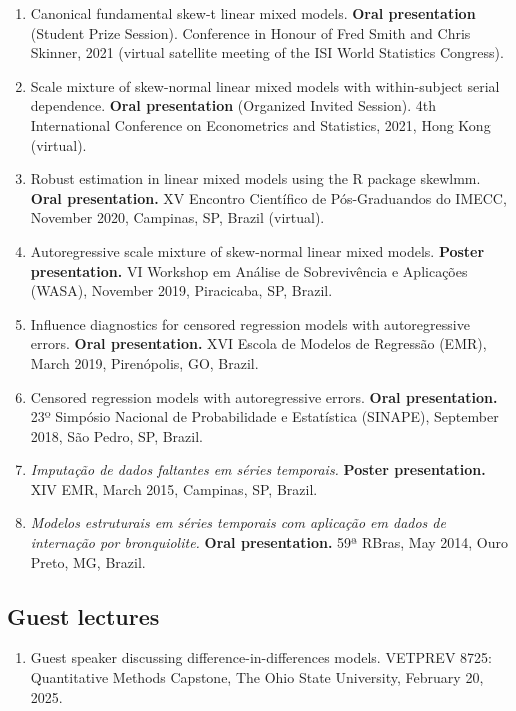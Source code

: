 \documentclass[
  10pt,
  letterpaper,
]{article}
\providecommand{\tightlist}{%
  \setlength{\itemsep}{0pt}\setlength{\parskip}{0pt}}
\begin{document}
\begin{enumerate}
\item
  Canonical fundamental skew-t linear mixed models. \textbf{Oral
  presentation} (Student Prize Session). Conference in Honour of Fred
  Smith and Chris Skinner, 2021 (virtual satellite meeting of the ISI
  World Statistics Congress).
\item
  Scale mixture of skew-normal linear mixed models with within-subject
  serial dependence. \textbf{Oral presentation} (Organized Invited
  Session). 4th International Conference on Econometrics and Statistics,
  2021, Hong Kong (virtual).
\item
  Robust estimation in linear mixed models using the R package skewlmm.
  \textbf{Oral presentation.} XV Encontro Científico de Pós-Graduandos
  do IMECC, November 2020, Campinas, SP, Brazil (virtual).
\item
  Autoregressive scale mixture of skew-normal linear mixed models.
  \textbf{Poster presentation.} VI Workshop em Análise de Sobrevivência
  e Aplicações (WASA), November 2019, Piracicaba, SP, Brazil.
\item
  Influence diagnostics for censored regression models with
  autoregressive errors. \textbf{Oral presentation.} XVI Escola de
  Modelos de Regressão (EMR), March 2019, Pirenópolis, GO, Brazil.
\item
  Censored regression models with autoregressive errors. \textbf{Oral
  presentation.} 23º Simpósio Nacional de Probabilidade e Estatística
  (SINAPE), September 2018, São Pedro, SP, Brazil.
\item
  \emph{Imputação de dados faltantes em séries temporais.}
  \textbf{Poster presentation.} XIV EMR, March 2015, Campinas, SP,
  Brazil.
\item
  \emph{Modelos estruturais em séries temporais com aplicação em dados
  de internação por bronquiolite.} \textbf{Oral presentation.} 59ª
  RBras, May 2014, Ouro Preto, MG, Brazil.
\end{enumerate}

\subsection{Guest lectures}\label{guest-lectures}

\begin{enumerate}
\def\labelenumi{\arabic{enumi}.}
\tightlist
\item
  Guest speaker discussing difference-in-differences models. VETPREV
  8725: Quantitative Methods Capstone, The Ohio State University,
  February 20, 2025.
\end{enumerate}
\end{document}
